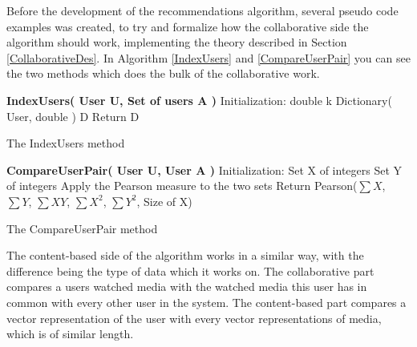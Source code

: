 Before the development of the recommendations algorithm, several pseudo code examples was created, to try and formalize how the collaborative side the algorithm should work, implementing the theory described in Section \ref{CollaborativeDes}. In Algorithm \ref{IndexUsers} and \ref{CompareUserPair} you can see the two methods which does the bulk of the collaborative work.

\begin{algorithm}[H]
	\DontPrintSemicolon
	\;
	\textbf{IndexUsers( User U, Set of users A )}\;
	Initialization:\;
	double k\;
	Dictionary( User, double ) D\;
	Return D\;
	\label{IndexUsers}
	\caption{The IndexUsers method}
\end{algorithm}


\begin{algorithm}[H]
	\DontPrintSemicolon
	\;
	\textbf{CompareUserPair( User U, User A )}\;
	Initialization:\;
	Set X of integers\;
	Set Y of integers\;
	Apply the Pearson measure to the two sets
	Return Pearson($\sum{X}$, $\sum{Y}$, $\sum{XY}$, $\sum{X^2}$, $\sum{Y^2}$, Size of X)
	\label{CompareUserPair}
	\caption{The CompareUserPair method}
\end{algorithm}

The content-based side of the algorithm works in a similar way, with the difference being the type of data which it works on. The collaborative part compares a users watched media with the watched media this user has in common with every other user in the system. The content-based part compares a vector representation of the user with every vector representations of media, which is of similar length.